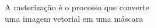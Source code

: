 \documentclass[preview]{standalone}
\begin{document}
A rasterização é o processo que converte\\uma imagem vetorial em uma máscara\\
\end{document}

